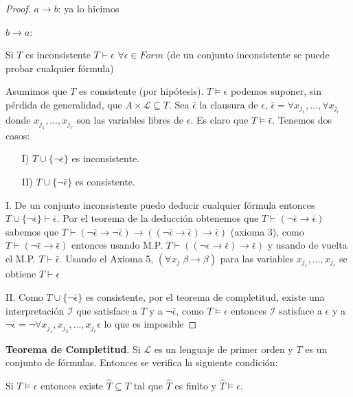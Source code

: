 \begin{proof}
$a \rightarrow b$: ya lo hicimos

$b \rightarrow a$:

Si $T$ es inconsistente $T \vdash \epsilon$ $\forall \epsilon \in Form$ (de un conjunto inconsistente se puede probar cualquier f\'ormula)

Asumimos que $T$ es consistente (por hip\'otesis). $T \models \epsilon$ podemos suponer, sin p\'erdida de generalidad, que $A \times \mathcal{L} \subseteq T$. Sea $\bar{\epsilon}$ la clausura de $\epsilon$, $\bar{\epsilon} = \forall x_{j_1}, \ldots, \forall x_{j_r}$ donde $x_{j_1}, \ldots, x_{j_r}$ son las variables libres de $\epsilon$. Es claro que $T \models \bar{\epsilon}$. Tenemos dos casos:

\begin{enumerate}
	\item[I)] $T \cup \{ \neg \bar{\epsilon}\}$ es inconsistente.
	\item[II)] $T \cup \{ \neg \bar{\epsilon}\}$ es consistente.
\end{enumerate}


I. De un conjunto inconsistente puedo deducir cualquier f\'ormula entonces $T \cup \{ \neg \bar{\epsilon}\} \vdash \bar{\epsilon}$. Por el teorema de la deducci\'on obtenemos que $T \vdash (\neg \bar{\epsilon} \rightarrow \bar{\epsilon})$ sabemos que $T \vdash (\neg \bar{\epsilon} \rightarrow \neg \bar{\epsilon}) \rightarrow ((\neg \bar{\epsilon} \rightarrow \bar{\epsilon}) \rightarrow \bar{\epsilon})$ (axioma 3), como $T \vdash (\neg \bar{\epsilon} \rightarrow \bar{\epsilon})$ entonces usando M.P. $T \vdash ((\neg \epsilon \rightarrow \bar{\epsilon}) \rightarrow \bar{\epsilon})$ y usando de vuelta el M.P. $T \vdash \bar{\epsilon}$. Usando el Axioma 5, $(\forall x_j \; \beta \rightarrow \beta)$ para las variables $x_{j_1}, \ldots, x_{j_r}$ se obtiene $T \vdash \epsilon$

II. Como $T \cup \{ \neg \bar{\epsilon}\}$ es consistente, por el teorema de completitud, existe una interpretaci\'on $\mathcal{I}$ que satisface a $T$ y a $\neg \bar{\epsilon}$, como $T \models \epsilon$ entonces $\mathcal{I}$ satisface a $\epsilon$ y a $\neg \bar{\epsilon} = \neg \forall x_{j_1}, x_{j_2}, \ldots, x_{j_r} \epsilon$  lo que es imposible

\end{proof}

\begin{colorario}
\textbf{Teorema de Completitud}. Si $\mathcal{L}$ es un lenguaje de primer orden y $T$ es un conjunto de f\'ormulas. Entonces se verifica la siguiente condici\'on:

Si $T \models \epsilon$ entonces existe $\hat{T} \subseteq T$ tal que $\hat{T}$ es finito y $\hat{T} \models \epsilon$.
\end{colorario}

